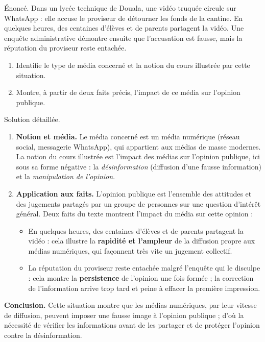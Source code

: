 \documentclass[11pt]{article}
\newcommand{\cle}[1]{{\popxbold\color{popdark}#1}}
\begin{document}
\begin{exoresolu}
Énoncé. Dans un lycée technique de Douala, une vidéo truquée circule sur WhatsApp : elle accuse le proviseur de détourner les fonds de la cantine. En quelques heures, des centaines d'élèves et de parents partagent la vidéo. Une enquête administrative démontre ensuite que l'accusation est fausse, mais la réputation du proviseur reste entachée.
\begin{enumerate}
\item Identifie le type de média concerné et la notion du cours illustrée par cette situation.
\item Montre, à partir de deux faits précis, l'impact de ce média sur l'opinion publique.
\end{enumerate}
\tcblower
Solution détaillée.
\begin{enumerate}
\item \textbf{Notion et média.} Le média concerné est un \cle{média numérique} (réseau social, messagerie WhatsApp), qui appartient aux médias de masse modernes. La notion du cours illustrée est \cle{l'impact des médias sur l'opinion publique}, ici sous sa forme négative : la \emph{désinformation} (diffusion d'une fausse information) et la \emph{manipulation de l'opinion}.
\item \textbf{Application aux faits.} L'opinion publique est l'ensemble des attitudes et des jugements partagés par un groupe de personnes sur une question d'intérêt général. Deux faits du texte montrent l'impact du média sur cette opinion :
\begin{itemize}
\item \og En quelques heures, des centaines d'élèves et de parents partagent la vidéo \fg{} : cela illustre la \textbf{rapidité et l'ampleur} de la diffusion propre aux médias numériques, qui façonnent très vite un jugement collectif.
\item \og La réputation du proviseur reste entachée \fg{} malgré l'enquête qui le disculpe : cela montre la \textbf{persistence} de l'opinion une fois formée ; la correction de l'information arrive trop tard et peine à effacer la première impression.
\end{itemize}
\end{enumerate}
\textbf{Conclusion.} Cette situation montre que les médias numériques, par leur vitesse de diffusion, peuvent imposer une fausse image à l'opinion publique ; d'où la nécessité de vérifier les informations avant de les partager et de protéger l'opinion contre la désinformation.
\end{exoresolu}
\end{document}

